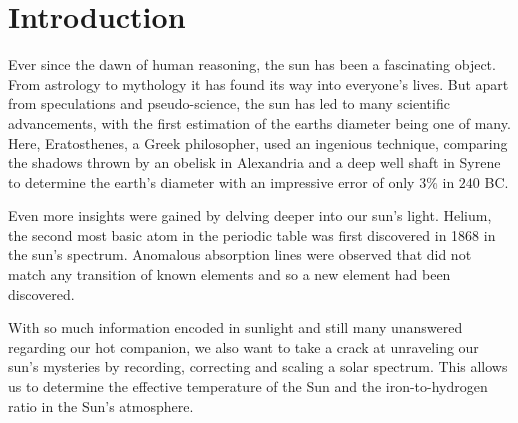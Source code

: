 \section{Introduction}
Ever since the dawn of human reasoning, the sun has been a fascinating object. From astrology to mythology it has found its way into everyone's lives. But apart from speculations and pseudo-science, the sun has led to many scientific advancements, with the first estimation of the earths diameter being one of many. Here, Eratosthenes, a Greek philosopher, used an ingenious technique, comparing the shadows thrown by an obelisk in Alexandria and a deep well shaft in Syrene to determine the earth's diameter with an impressive error of only $3 \%$ in $240$ BC. 

Even more insights were gained by delving deeper into our sun's light. Helium, the second most basic atom in the periodic table was first discovered in 1868 in the sun's spectrum. Anomalous absorption lines were observed that did not match any transition of known elements and so a new element had been discovered. 

With so much information encoded in sunlight and still many unanswered regarding our hot companion, we also want to take a crack at unraveling our sun's mysteries by recording, correcting and scaling a solar spectrum. This allows us to determine the effective temperature of the Sun and the iron-to-hydrogen ratio in the Sun's atmosphere.

